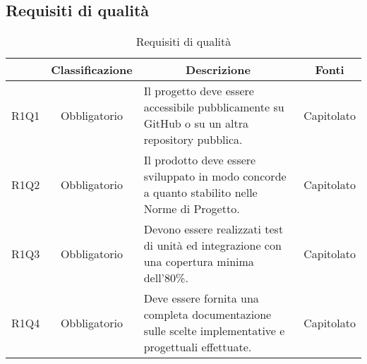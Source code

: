 \subsection{Requisiti di qualità} \label{subsection:requisiti_qualita}
\begin{table}[H]
    \centering
    \renewcommand{\arraystretch}{1.8}
    \begin{tabular}{c | c | p{6cm} | c}
        \rowcolor[HTML]{125E28}
        \multicolumn{1}{c}{\color[HTML]{FFFFFF} \textbf{Codice}} & 
		\multicolumn{1}{c}{\color[HTML]{FFFFFF} \textbf{Classificazione}} & 
		\multicolumn{1}{c}{\color[HTML]{FFFFFF} \textbf{Descrizione}} & 
		\multicolumn{1}{c}{\color[HTML]{FFFFFF} \textbf{Fonti}} \\
        \hline
        R1Q1 & Obbligatorio & Il progetto deve essere accessibile pubblicamente su GitHub\glo{} o su un altra repository\glo{} pubblica. & Capitolato \\
        R1Q2 & Obbligatorio & Il prodotto deve essere sviluppato in modo concorde a quanto stabilito nelle Norme di Progetto\glo{}. & Capitolato \\
        R1Q3 & Obbligatorio & Devono essere realizzati test di unità ed integrazione con una copertura minima dell'80\%. & Capitolato\\
        R1Q4 & Obbligatorio & Deve essere fornita una completa documentazione sulle scelte implementative e progettuali effettuate. & Capitolato \\
    \end{tabular}
    \caption{Requisiti di qualità}
\end{table}


